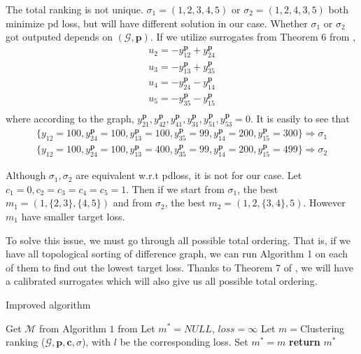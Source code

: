 The total ranking is not unique. $\sigma_1=(1,2,3,4,5)$ or $\sigma_2=(1,2,4,3,5)$ both minimize pd loss, but will have different solution in our case. Whether $\sigma_1$ or $\sigma_2$ got outputed depends on $(\mathcal{G}, \mathbf{p})$. If we utilize surrogates from Theorem 6 from \cite{ramaswamy2013convex}, 
\begin{equation}
\begin{split}
u_2=-y_{12}^{\mathbf{p}}+y_{24}^{\mathbf{p}}\\
u_3 = -y_{13}^{\mathbf{p}}+y_{35}^{\mathbf{p}}\\
u_4 = -y_{24}^{\mathbf{p}}-y_{14}^{\mathbf{p}}\\
u_5 = -y_{35}^{\mathbf{p}}-y_{15}^{\mathbf{p}}\\
\end{split}
\end{equation}
where according to the graph, $y_{21}^{\mathbf{p}}, y_{42}^{\mathbf{p}}, y_{41}^{\mathbf{p}}, y_{31}^{\mathbf{p}}, y_{51}^{\mathbf{p}}, y_{53}^{\mathbf{p}}=0$. It is easily to see that
\begin{equation}
\begin{split}
\{y_{12}=100, y_{24}^{\mathbf{p}}=100, y_{13}^{\mathbf{p}}=100, y_{35}^{\mathbf{p}}=99, y_{14}^{\mathbf{p}}=200, y_{15}^{\mathbf{p}}=300\}\Rightarrow \sigma_1\\
\{y_{12}=100, y_{24}^{\mathbf{p}}=100, y_{13}^{\mathbf{p}}=400, y_{35}^{\mathbf{p}}=99, y_{14}^{\mathbf{p}}=200, y_{15}^{\mathbf{p}}=499\}\Rightarrow \sigma_2
\end{split}
\end{equation}

Although $\sigma_1, \sigma_2$ are equivalent w.r.t pdloss, it is not for our case. Let $c_1=0, c_2=c_3=c_4=c_5=1$. Then if we start from $\sigma_1$, the best $m_1=(1,\{2,3\}, \{4,5\})$ and from $\sigma_2$, the best $m_2=(1,2,\{3,4\}, 5)$. However $m_1$ have smaller target loss. 

To solve this issue, we must go through all possible total ordering. That is, if we have all topological sorting of difference graph, we can run Algorithm 1 on each of them to find out the lowest target loss. Thanks to Theorem 7 of \cite{ramaswamy2013convex}, we will have a calibrated surrogates which will also give us all possible total ordering.

\begin{algorithm}[H]
	\caption{Improved algorithm}
	\begin{algorithmic}[1]
		\State Get $\mathcal{M}$ from Algorithm $1$ from \cite{ramaswamy2013convex}
		\State Let $m^*=NULL$, $loss = \infty$
		\State
		Let $m=${Clustering ranking }{($\mathcal{G}, \mathbf{p}, \mathbf{c}, \sigma$)}, with $l$ be the corresponding loss.
		Set $m^*=m$
		\EndIf
		\EndFor
		\State \textbf{return} $m^*$
		\EndProcedure
	\end{algorithmic}
\end{algorithm}

